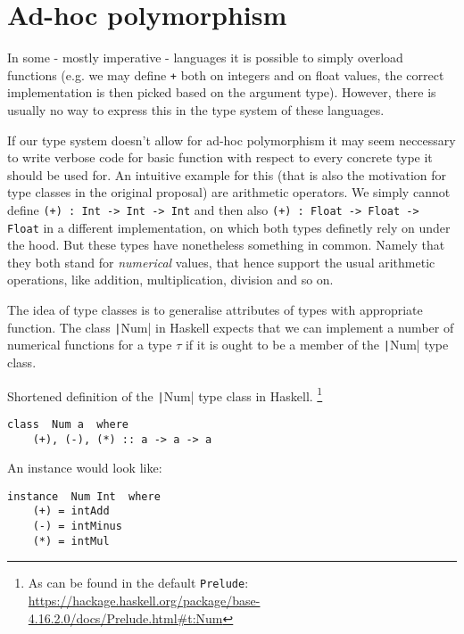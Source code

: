 \section{Ad-hoc polymorphism}\label{sec:ad-hoc-polymorphism}

In some - mostly imperative - languages it is possible to simply overload functions (e.g. we may define \texttt{+} both on integers and on float values, the correct implementation is then picked based on the argument type).
However, there is usually no way to express this in the type system of these languages. %

If our type system doesn't allow for ad-hoc polymorphism it may seem neccessary to write verbose code for basic function with respect to every concrete type it should be used for.
An intuitive example for this (that is also the motivation for type classes in the original proposal) are arithmetic operators.
We simply cannot define \texttt{(+) : Int -> Int -> Int} and then also \texttt{(+) : Float -> Float -> Float} in a different implementation, on which both types definetly rely on under the hood.
But these types have nonetheless something in common. Namely that they both stand for \emph{numerical} values, that hence support the usual arithmetic operations, like addition, multiplication, division and so on.

The idea of type classes is to generalise attributes of types with appropriate function.
The class \texttt|Num| in Haskell expects that we can implement a number of numerical functions for a type $\tau$ if it is ought to be a member of the \texttt|Num| type class.

Shortened definition of the \texttt|Num| type class in Haskell.
\footnote{As can be found in the default \texttt{Prelude}: \url{https://hackage.haskell.org/package/base-4.16.2.0/docs/Prelude.html\#t:Num}}

\begin{verbatim}
class  Num a  where
    (+), (-), (*) :: a -> a -> a
\end{verbatim}

An instance would look like:

\begin{verbatim}
instance  Num Int  where
    (+) = intAdd
    (-) = intMinus
    (*) = intMul
\end{verbatim}



